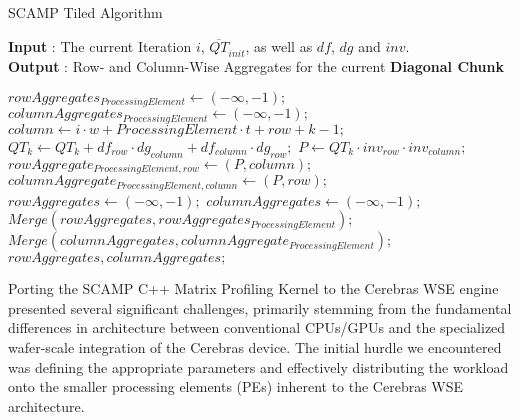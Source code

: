 \clearpage

\begin{algorithm}
    \caption{SCAMP Tiled Algorithm}
    \label{scamp_tiled_algorithm}
    \hspace*{\algorithmicindent} \textbf{Input} : The current Iteration $i$, $\overline{QT}_{init}$, as well as $df$, $dg$ and $inv$.\\
    \hspace*{\algorithmicindent} \textbf{Output} : Row- and Column-Wise Aggregates for the current \textbf{Diagonal Chunk}
    \begin{algorithmic}[1]
            \State $rowAggregates_{ProcessingElement} \gets (-\infty, -1);$
            \State $columnAggregates_{ProcessingElement} \gets (-\infty, -1);$
                    \State $column \gets i \cdot w + ProcessingElement \cdot t + row + k - 1;$
                    \State $QT_k \gets QT_k + df_{row} \cdot dg_{column} + df_{column} \cdot dg_{row};$
                    \State $P \gets QT_k \cdot inv_{row} \cdot inv_{column};$
                        \State $rowAggregate_{ProcessingElement, row} \gets (P, column);$
                    \EndIf
                        \State $columnAggregate_{ProcessingElement, column} \gets (P, row);$
                    \EndIf
                \EndFor
            \EndFor
        \EndFor
        \State $rowAggregates \gets (-\infty, -1);$
        \State $columnAggregates \gets (-\infty, -1);$
            \State $Merge(rowAggregates, rowAggregates_{ProcessingElement});$
            \State $Merge(columnAggregates, columnAggregate_{ProcessingElement});$
        \EndFor\\
        \Return $rowAggregates, columnAggregates;$
    \end{algorithmic}
\end{algorithm}

Porting the SCAMP C++ Matrix Profiling Kernel to the Cerebras WSE engine presented several significant challenges, primarily stemming from the fundamental differences in architecture between conventional CPUs/GPUs and the specialized wafer-scale integration of the Cerebras device. The initial hurdle we encountered was defining the appropriate parameters and effectively distributing the workload onto the smaller processing elements (PEs) inherent to the Cerebras WSE architecture.

